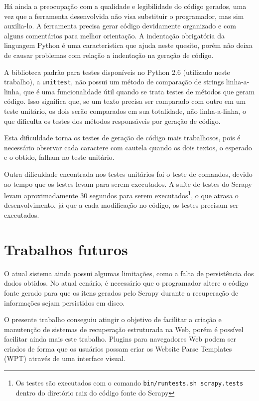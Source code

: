 Há ainda a preocupação com a qualidade e legibilidade do código gerados, uma vez que a ferramenta desenvolvida não visa substituir o programador, mas sim auxilia-lo. A ferramenta precisa gerar código devidamente organizado e com alguns comentários para melhor orientação. A indentação obrigatória da linguagem Python é uma característica que ajuda neste quesito, porém não deixa de causar problemas com relação a indentação na geração de código.

A biblioteca padrão para testes disponíveis no Python 2.6 (utilizado neste trabalho), a \texttt{unittest}, não possui um método de comparação de strings linha-a-linha, que é uma funcionalidade útil quando se trata testes de métodos que geram código. Isso significa que, se um texto precisa ser comparado com outro em um teste unitário, os dois serão comparados em sua totalidade, não linha-a-linha, o que dificulta os testes dos métodos responsáveis por geração de código.

Esta dificuldade torna os testes de geração de código mais trabalhosos, pois é necessário observar cada caractere com cautela quando os dois textos, o esperado e o obtido, falham no teste unitário.

Outra dificuldade encontrada nos testes unitários foi o teste de comandos, devido ao tempo que os testes levam para serem executados. A suíte de testes do Scrapy levam aproximadamente 30 segundos para serem executados\footnote{Os testes são executados com o comando \texttt{bin/runtests.sh scrapy.tests} dentro do diretório raiz do código fonte do Scrapy }, o que atrasa o desenvolvimento, já que a cada modificação no código, os testes precisam ser executados.
\vfill

\pagebreak
\section{Trabalhos futuros}

O atual sistema ainda possui algumas limitações, como a falta de persistência dos dados obtidos. No atual cenário, é necessário que o programador altere o código fonte gerado para que os itens gerados pelo Scrapy durante a recuperação de informações sejam persistidos em disco.

O presente trabalho conseguiu atingir o objetivo de facilitar a criação e manutenção de sistemas de recuperação estruturada na Web, porém é possível facilitar ainda mais este trabalho. Plugins para navegadores Web podem ser criados de forma que os usuários possam criar os Website Parse Templates (WPT) através de uma interface visual.

